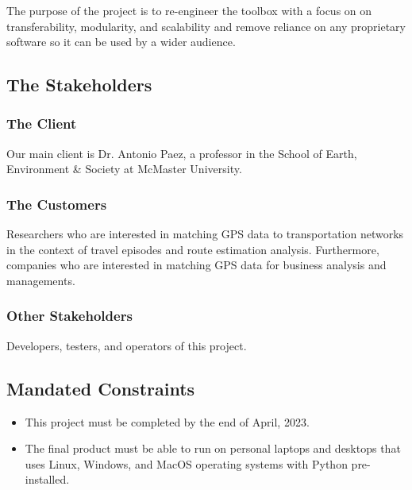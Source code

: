 \documentclass[12pt, titlepage]{article}
\begin{document}
\noindent The purpose of the project is to re-engineer the toolbox with a focus on on transferability, modularity, and scalability and remove reliance on any proprietary software so it can be used by a wider audience. 

\subsection{The Stakeholders}
\subsubsection{The Client}
Our main client is Dr. Antonio Paez, a professor in the School of Earth, Environment & Society at McMaster University. 

\subsubsection{The Customers}
Researchers who are interested in matching GPS data to transportation networks in the context of travel episodes and route estimation analysis. Furthermore, companies who are interested in matching GPS data for business analysis and managements. 

\subsubsection{Other Stakeholders}
Developers, testers, and operators of this project.

\subsection{Mandated Constraints}
\begin{itemize}
    \item This project must be completed by the end of April, 2023.
    \item The final product must be able to run on personal laptops and desktops that uses Linux, Windows, and MacOS operating systems with Python pre-installed.
\end{itemize}
\end{document}
